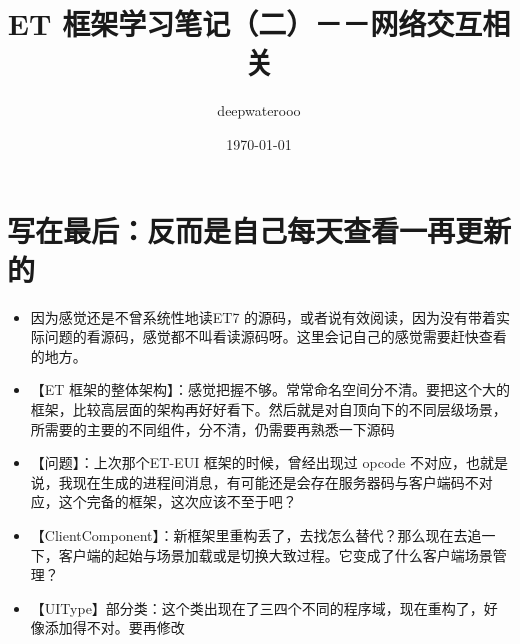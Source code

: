 \documentclass[9pt, b5paper]{article}
\author{deepwaterooo}
\date{\today}
\title{ET 框架学习笔记（二）－－网络交互相关}
\begin{document}
\maketitle
\tableofcontents


\section{写在最后：反而是自己每天查看一再更新的}
\label{sec-1}
\begin{itemize}
\item 因为感觉还是不曾系统性地读ET7 的源码，或者说有效阅读，因为没有带着实际问题的看源码，感觉都不叫看读源码呀。这里会记自己的感觉需要赶快查看的地方。
\item 【ET 框架的整体架构】：感觉把握不够。常常命名空间分不清。要把这个大的框架，比较高层面的架构再好好看下。然后就是对自顶向下的不同层级场景，所需要的主要的不同组件，分不清，仍需要再熟悉一下源码
\item 【问题】：上次那个ET-EUI 框架的时候，曾经出现过 opcode 不对应，也就是说，我现在生成的进程间消息，有可能还是会存在服务器码与客户端码不对应，这个完备的框架，这次应该不至于吧？
\item 【ClientComponent】：新框架里重构丢了，去找怎么替代？那么现在去追一下，客户端的起始与场景加载或是切换大致过程。它变成了什么客户端场景管理？
\item 【UIType】部分类：这个类出现在了三四个不同的程序域，现在重构了，好像添加得不对。要再修改
\end{itemize}
\end{document}
